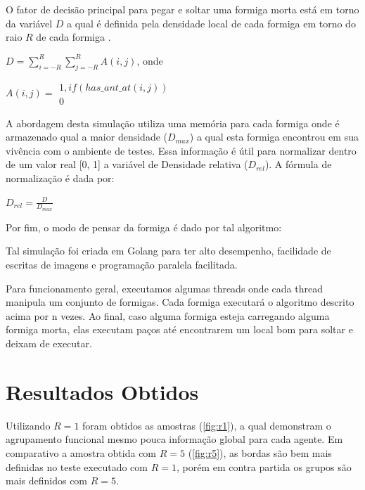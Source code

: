 \documentclass[conference]{IEEEtran}
\begin{document}
O fator de decisão principal para pegar e soltar uma formiga morta está em torno da variável $D$ a qual é definida pela densidade local de cada formiga em torno do raio $R$ de cada formiga \cite{b2}.


$D = \sum_{i=-R}^{R}\sum_{j=-R}^{R}A(i,j)$, onde

$A(i,j) =
\begin{array}{ll}
    1, if(has\_ant\_at(i,j))\\
    0
\end{array}
$

A abordagem desta simulação utiliza uma memória para cada formiga onde é armazenado qual a maior densidade ($D_{max}$) a qual esta formiga encontrou em sua vivência com o ambiente de testes. Essa informação é útil para normalizar dentro de um valor real [0, 1] a variável de Densidade relativa ($D_{rel}$). A fórmula de normalização é dada por\cite{b2}:

$
    D_{rel} = \frac{D}{D_{max}}
$

Por fim, o modo de pensar da formiga é dado por tal algoritmo:



Tal simulação foi criada em Golang para ter alto desempenho, facilidade de escritas de imagens e programação paralela facilitada.

Para funcionamento geral, executamos algumas threads onde cada thread manipula um conjunto de formigas. Cada formiga executará o algoritmo descrito acima por n vezes. Ao final, caso alguma formiga esteja carregando alguma formiga morta, elas executam paços até encontrarem um local bom para soltar e deixam de executar.

\section{Resultados Obtidos}

Utilizando $R=1$ foram obtidos as amostras (\ref{fig:r1}), a qual demonstram o agrupamento funcional mesmo pouca informação global para cada agente. Em comparativo a amostra obtida com $R=5$ (\ref{fig:r5}), as bordas são bem mais definidas no teste executado com $R=1$, porém em contra partida os grupos são mais definidos com $R=5$.
\end{document}
